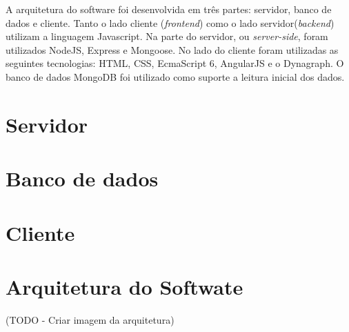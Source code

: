 \label{ap:tecnologias}

A arquitetura do software foi desenvolvida em três partes: servidor, banco de dados e cliente. Tanto o lado cliente (\textit{frontend}) como o lado servidor(\textit{backend})
utilizam a linguagem Javascript.
Na parte do servidor, ou \textit{server-side}, foram utilizados NodeJS, Express e Mongoose. No lado do cliente foram utilizadas as seguintes tecnologias:
HTML, CSS, EcmaScript 6, AngularJS e o Dynagraph. O banco de dados MongoDB foi utilizado como suporte a leitura inicial dos dados.


\section{Servidor}

\section{Banco de dados}

\section{Cliente}

\section{Arquitetura do Softwate}

(TODO - Criar imagem da arquitetura)